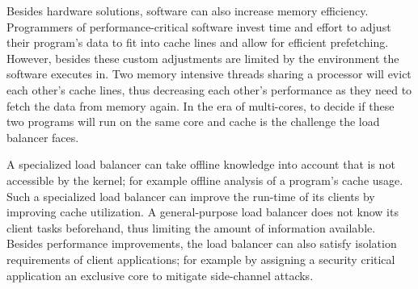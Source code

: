 \begin{comment}
Two hardware improvements minimize the time a CPU idles, while waiting for
memory: out-of-order execution and simultaneous multi-threading.
Out-of-order CPUs reorder instructions, such that a instruction waiting for
input data is surpassed by instructions with available input.
After execution the results are written to memory in their original order.
Whereas simultaneous multi-threading employs two or more hardware threads
executing on the same physical hardware.
If one hardware thread waits for memory or just uses a subset of all available
execution units, the others can utilize the idle resources.
\end{comment}
%
Besides hardware solutions, software can also increase memory efficiency.
Programmers of performance-critical software invest time and effort to adjust
their program's data to fit into cache lines and allow for efficient prefetching.
However, besides these custom adjustments are limited by the
environment the software executes in.
Two memory intensive threads sharing a processor will evict each other's
cache lines, thus decreasing each other's performance as they need to fetch the
data from memory again.
In the era of multi-cores, to decide if these two programs will run on
the same core and cache is the challenge the load balancer faces.

\begin{comment}
While Linux runs a scheduler which is also in charge of load balancing, these
are two separate jobs.
It is the scheduler's duty to provide an equal amount of CPU time to each
running task, depending on the task's priority.
To decide, which tasks runs on which core on the other hand,
that is the responsibility of the load balancer.

Thus, the load balancer is not necessarily part of the kernel.
To allow for workload specific load balancers, Linux provides an interface to
overrule kernel decisions.
This is also the case for the Fiasco.OC microkernel and the L4Re user-land
environment.
\end{comment}

A specialized load balancer can take offline knowledge into account that is not
accessible by the kernel;
for example offline analysis of a program's cache usage.
Such a specialized load balancer can improve the run-time of its clients by
improving cache utilization.
A general-purpose load balancer does not know its client tasks
beforehand, thus limiting the amount of information available.
Besides performance improvements, the load balancer can also satisfy isolation
requirements of client applications; for example by assigning a security
critical application an exclusive core to mitigate side-channel attacks.

